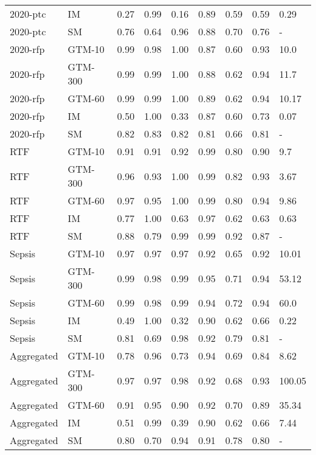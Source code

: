 \begin{tabular}{llrrrrrrl}
2020-ptc & IM & 0.27 & 0.99 & 0.16 & 0.89 & 0.59 & 0.59 & 0.29 \\
2020-ptc & SM & 0.76 & 0.64 & 0.96 & 0.88 & 0.70 & 0.76 & - \\
2020-rfp & GTM-10 & 0.99 & 0.98 & 1.00 & 0.87 & 0.60 & 0.93 & 10.0 \\
2020-rfp & GTM-300 & 0.99 & 0.99 & 1.00 & 0.88 & 0.62 & 0.94 & 11.7 \\
2020-rfp & GTM-60 & 0.99 & 0.99 & 1.00 & 0.89 & 0.62 & 0.94 & 10.17 \\
2020-rfp & IM & 0.50 & 1.00 & 0.33 & 0.87 & 0.60 & 0.73 & 0.07 \\
2020-rfp & SM & 0.82 & 0.83 & 0.82 & 0.81 & 0.66 & 0.81 & - \\
RTF & GTM-10 & 0.91 & 0.91 & 0.92 & 0.99 & 0.80 & 0.90 & 9.7 \\
RTF & GTM-300 & 0.96 & 0.93 & 1.00 & 0.99 & 0.82 & 0.93 & 3.67 \\
RTF & GTM-60 & 0.97 & 0.95 & 1.00 & 0.99 & 0.80 & 0.94 & 9.86 \\
RTF & IM & 0.77 & 1.00 & 0.63 & 0.97 & 0.62 & 0.63 & 0.63 \\
RTF & SM & 0.88 & 0.79 & 0.99 & 0.99 & 0.92 & 0.87 & - \\
Sepsis & GTM-10 & 0.97 & 0.97 & 0.97 & 0.92 & 0.65 & 0.92 & 10.01 \\
Sepsis & GTM-300 & 0.99 & 0.98 & 0.99 & 0.95 & 0.71 & 0.94 & 53.12 \\
Sepsis & GTM-60 & 0.99 & 0.98 & 0.99 & 0.94 & 0.72 & 0.94 & 60.0 \\
Sepsis & IM & 0.49 & 1.00 & 0.32 & 0.90 & 0.62 & 0.66 & 0.22 \\
Sepsis & SM & 0.81 & 0.69 & 0.98 & 0.92 & 0.79 & 0.81 & - \\
Aggregated & GTM-10 & 0.78 & 0.96 & 0.73 & 0.94 & 0.69 & 0.84 & 8.62 \\
Aggregated & GTM-300 & 0.97 & 0.97 & 0.98 & 0.92 & 0.68 & 0.93 & 100.05 \\
Aggregated & GTM-60 & 0.91 & 0.95 & 0.90 & 0.92 & 0.70 & 0.89 & 35.34 \\
Aggregated & IM & 0.51 & 0.99 & 0.39 & 0.90 & 0.62 & 0.66 & 7.44 \\
Aggregated & SM & 0.80 & 0.70 & 0.94 & 0.91 & 0.78 & 0.80 & - \\
\bottomrule
\end{tabular}

